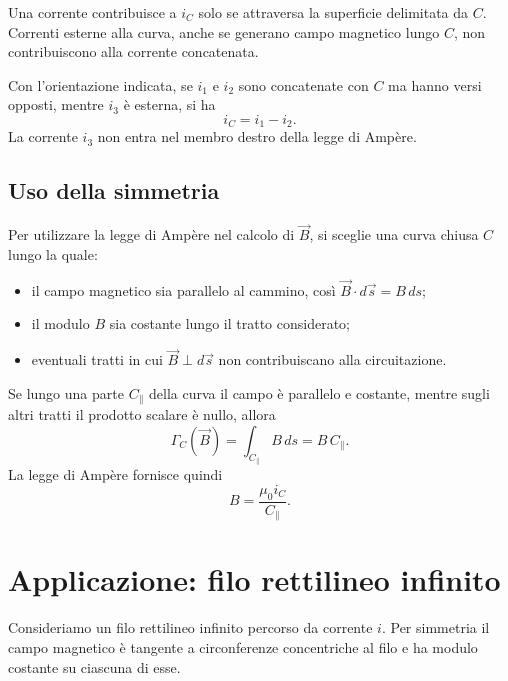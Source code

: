 \documentclass[a4paper]{article}
\begin{document}
Una corrente contribuisce a \(i_C\) solo se attraversa la superficie delimitata da \(C\). Correnti esterne alla curva, anche se generano campo magnetico lungo \(C\), non contribuiscono alla corrente concatenata.

\begin{center}
\end{center}

Con l'orientazione indicata, se \(i_1\) e \(i_2\) sono concatenate con \(C\) ma hanno versi opposti, mentre \(i_3\) è esterna, si ha
\[
    i_C=i_1-i_2.
\]
La corrente \(i_3\) non entra nel membro destro della legge di Ampère.

\subsection{Uso della simmetria}

Per utilizzare la legge di Ampère nel calcolo di \(\vec{B}\), si sceglie una curva chiusa \(C\) lungo la quale:
\begin{itemize}
    \item il campo magnetico sia parallelo al cammino, così \(\vec{B}\cdot d\vec{s}=B\,ds\);
    \item il modulo \(B\) sia costante lungo il tratto considerato;
    \item eventuali tratti in cui \(\vec{B}\perp d\vec{s}\) non contribuiscano alla circuitazione.
\end{itemize}

Se lungo una parte \(C_\parallel\) della curva il campo è parallelo e costante, mentre sugli altri tratti il prodotto scalare è nullo, allora
\[
    \Gamma_C(\vec{B})=\int_{C_\parallel} B\,ds
    =B\,C_\parallel.
\]
La legge di Ampère fornisce quindi
\[
    B=\frac{\mu_0 i_C}{C_\parallel}.
\]

\section{Applicazione: filo rettilineo infinito}

Consideriamo un filo rettilineo infinito percorso da corrente \(i\). Per simmetria il campo magnetico è tangente a circonferenze concentriche al filo e ha modulo costante su ciascuna di esse.
\end{document}
